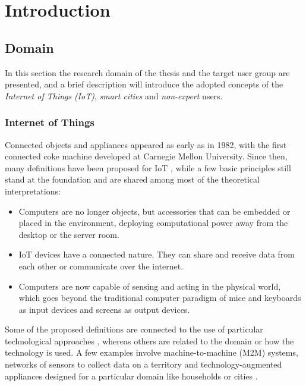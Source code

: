 \mainmatter

\chapter{Introduction}
\label{cha:introduction}

\section{Domain}
\label{sec:domain}

In this section the research domain of the thesis and the target user group are presented, and a brief description will introduce the adopted concepts of the \textit{Internet of Things} \textit{(IoT)}, \textit{smart cities} and \textit{non-expert} users.


\subsection{Internet of Things}

Connected objects and appliances appeared as early as in 1982, with the first connected coke machine developed at Carnegie Mellon University. Since then, many definitions have been proposed for IoT \autocites{ashton_that_2009}{gubbi_internet_2013}, while a few basic principles still stand at the foundation and are shared among most of the theoretical interpretations:
\begin{itemize}
	\item Computers are no longer objects, but accessories that can be embedded or placed in the environment, deploying computational power away from the desktop or the server room.
	\item IoT devices have a connected nature. They can share and receive data from each other or communicate over the internet.
	\item Computers are now capable of sensing and acting in the physical world, which goes beyond the traditional computer paradigm of mice and keyboards as input devices and screens as output devices.
\end{itemize}

Some of the proposed definitions are connected to the use of particular technological approaches \autocite{welbourne_building_2009}, whereas others are related to the domain or how the technology is used. A few examples involve machine-to-machine (M2M) systems, networks of sensors to collect data on a territory \autocite{murty_citysense_2008} and technology-augmented appliances designed for a particular domain like households \autocite{alkar_internet_2005} or cities \autocite{hernandez-munoz_smart_2011}. 

